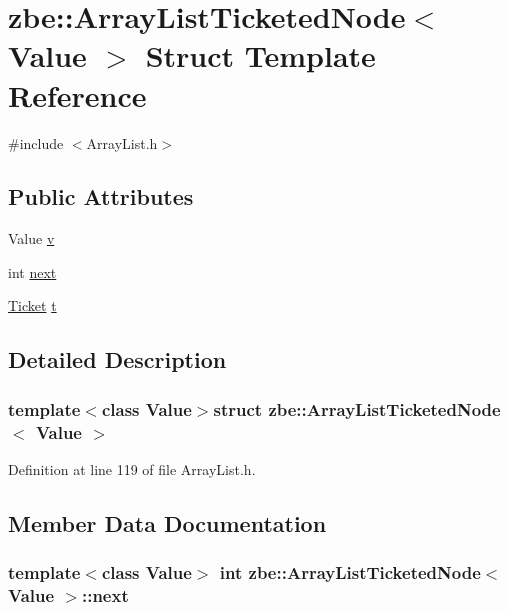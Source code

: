 \hypertarget{structzbe_1_1_array_list_ticketed_node}{}\section{zbe\+:\+:Array\+List\+Ticketed\+Node$<$ Value $>$ Struct Template Reference}
\label{structzbe_1_1_array_list_ticketed_node}


{\ttfamily \#include $<$Array\+List.\+h$>$}

\subsection*{Public Attributes}
\begin{DoxyCompactItemize}
\item 
Value \hyperlink{structzbe_1_1_array_list_ticketed_node_ae04e02e278b795dc6f657df33b0d52e1}{v}
\item 
int \hyperlink{structzbe_1_1_array_list_ticketed_node_a5a8f613daae38000942031888f3f8d52}{next}
\item 
\hyperlink{classzbe_1_1_ticket}{Ticket} \hyperlink{structzbe_1_1_array_list_ticketed_node_a4bef8c634cd8a3a31f20c1720a05a2fc}{t}
\end{DoxyCompactItemize}


\subsection{Detailed Description}
\subsubsection*{template$<$class Value$>$struct zbe\+::\+Array\+List\+Ticketed\+Node$<$ Value $>$}



Definition at line 119 of file Array\+List.\+h.



\subsection{Member Data Documentation}
\hypertarget{structzbe_1_1_array_list_ticketed_node_a5a8f613daae38000942031888f3f8d52}{}
\subsubsection[{next}]{\setlength{\rightskip}{0pt plus 5cm}template$<$class Value$>$ int {\bf zbe\+::\+Array\+List\+Ticketed\+Node}$<$ Value $>$\+::next}\label{structzbe_1_1_array_list_ticketed_node_a5a8f613daae38000942031888f3f8d52}


